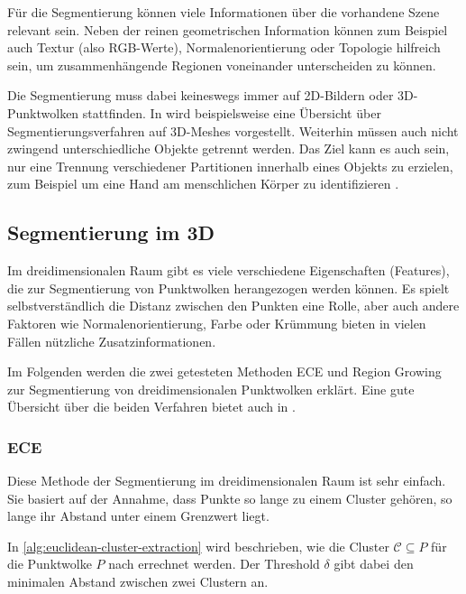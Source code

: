 Für die Segmentierung können viele Informationen über die vorhandene Szene relevant sein.
Neben der reinen geometrischen Information können zum Beispiel auch Textur (also RGB-Werte), Normalenorientierung oder Topologie hilfreich sein, um zusammenhängende Regionen voneinander unterscheiden zu können.

Die Segmentierung muss dabei keineswegs immer auf 2D-Bildern oder 3D-Punktwolken stattfinden.
In \cite{shamir2008survey} wird beispielsweise eine Übersicht über Segmentierungsverfahren auf 3D-Meshes vorgestellt.
Weiterhin müssen auch nicht zwingend unterschiedliche Objekte getrennt werden.
Das Ziel kann es auch sein, nur eine Trennung verschiedener Partitionen innerhalb eines Objekts zu erzielen, zum Beispiel um eine Hand am menschlichen Körper zu identifizieren \cite{shapira2008consistent}.


\subsection{Segmentierung im 3D}
\label{subsec:3d-segmentation}

Im dreidimensionalen Raum gibt es viele verschiedene Eigenschaften (Features), die zur Segmentierung von Punktwolken herangezogen werden können.
Es spielt selbstverständlich die Distanz zwischen den Punkten eine Rolle, aber auch andere Faktoren wie Normalenorientierung, Farbe oder Krümmung bieten in vielen Fällen nützliche Zusatzinformationen.

Im Folgenden werden die zwei getesteten Methoden \ac{ECE} und Region Growing zur Segmentierung von dreidimensionalen Punktwolken erklärt.
Eine gute Übersicht über die beiden Verfahren bietet auch \citeauthor{RusuDoctoralDissertation} in \cite[88--93]{RusuDoctoralDissertation}.

\subsubsection{\acl{ECE}}
\label{subsubsec:euclidean-cluster-extraction}

Diese Methode der Segmentierung im dreidimensionalen Raum ist sehr einfach.
Sie basiert auf der Annahme, dass Punkte so lange zu einem Cluster gehören, so lange ihr Abstand unter einem Grenzwert liegt.

In \autoref{alg:euclidean-cluster-extraction} wird beschrieben, wie die Cluster $\mathcal{C} \subseteq P$ für die Punktwolke $P$ nach \cite[89--90]{RusuDoctoralDissertation} errechnet werden.
Der Threshold $\delta$ gibt dabei den minimalen Abstand zwischen zwei Clustern an.

